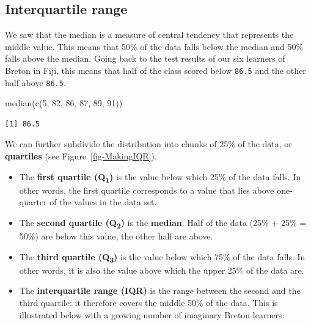 \documentclass[
  letterpaper,
  DIV=11,
  numbers=noendperiod]{scrreprt}
\newenvironment{Shaded}{\begin{snugshade}}{\end{snugshade}}
\newcommand{\DecValTok}[1]{\textcolor[rgb]{0.68,0.00,0.00}{#1}}
\newcommand{\FunctionTok}[1]{\textcolor[rgb]{0.28,0.35,0.67}{#1}}
\newcommand{\NormalTok}[1]{\textcolor[rgb]{0.00,0.23,0.31}{#1}}
\begin{document}
\subsection{Interquartile range}\label{sec-IQR}

We saw that the median is a measure of central tendency that represents
the middle value. This means that 50\% of the data falls below the
median and 50\% falls above the median. Going back to the test results
of our six learners of Breton in Fiji, this means that half of the class
scored below \texttt{86.5} and the other half above \texttt{86.5}.

\begin{Shaded}
\begin{Highlighting}[]
\FunctionTok{median}\NormalTok{(}\FunctionTok{c}\NormalTok{(}\DecValTok{5}\NormalTok{, }\DecValTok{82}\NormalTok{, }\DecValTok{86}\NormalTok{, }\DecValTok{87}\NormalTok{, }\DecValTok{89}\NormalTok{, }\DecValTok{91}\NormalTok{))}
\end{Highlighting}
\end{Shaded}

\begin{verbatim}
[1] 86.5
\end{verbatim}

We can further subdivide the distribution into chunks of 25\% of the
data, or \textbf{quartiles} (see Figure~\ref{fig-MakingIQR}).

\begin{itemize}
\item
  The \textbf{first quartile (Q\textsubscript{1})} is the value below
  which 25\% of the data falls. In other words, the first quartile
  corresponds to a value that lies above one-quarter of the values in
  the data set.
\item
  The \textbf{second quartile (Q\textsubscript{2})} is the
  \textbf{median}. Half of the data (25\% + 25\% = 50\%) are below this
  value, the other half are above.
\item
  The \textbf{third quartile (Q\textsubscript{3})} is the value below
  which 75\% of the data falls. In other words, it is also the value
  above which the upper 25\% of the data are.
\item
  The \textbf{interquartile range (IQR)} is the range between the second
  and the third quartile: it therefore covers the middle 50\% of the
  data. This is illustrated below with a growing number of imaginary
  Breton learners.
\end{itemize}
\end{document}
